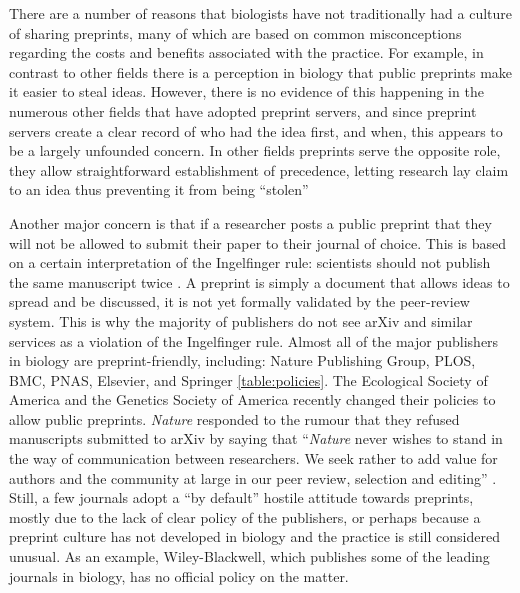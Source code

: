 \documentclass[letterpaper,twocolumn,superscriptaddress,showkeys,longbibliography]{revtex4-1}
\begin{document}
There are a number of reasons that biologists have not traditionally had a
culture of sharing preprints, many of which are based on common misconceptions
regarding the costs and benefits associated with the practice. For example, in contrast
to other fields there is a perception in biology that public preprints
make it easier to steal ideas. However, there is no evidence of this happening
in the numerous other fields that have adopted preprint servers, and since preprint
servers create a clear record of who had the idea first, and when, this
appears to be a largely unfounded concern. In other fields preprints serve the
opposite role, they allow straightforward establishment of precedence, letting
research lay claim to an idea thus preventing it from being ``stolen'' \cite{gin11}

Another major concern is that if a researcher posts a public preprint that they
will not be allowed to submit their paper to their journal of choice.  This is
based on a certain interpretation of the Ingelfinger rule: scientists should not
publish the same manuscript twice \cite{alt96}. A preprint is simply a document
that allows ideas to spread and be discussed, it is not yet formally validated
by the peer-review system. This is why the majority of publishers do not see
arXiv and similar services as a violation of the Ingelfinger rule. Almost all of
the major publishers in biology are preprint-friendly, including: Nature
Publishing Group, PLOS, BMC, PNAS, Elsevier, and Springer \ref{table:policies}.
The Ecological Society of America and the Genetics Society of America recently
changed their policies to allow public preprints. \emph{Nature}
responded to the rumour that they refused manuscripts submitted to arXiv by
saying that ``\emph{Nature} never wishes to stand in the way of communication
between researchers. We seek rather to add value for authors and the community
at large in our peer review, selection and editing'' \cite{nat05}.  Still, a few
journals adopt a ``by default'' hostile attitude towards preprints, mostly due
to the lack of clear policy of the publishers, or perhaps because a preprint
culture has not developed in biology and the practice is still considered
unusual. As an example, Wiley-Blackwell, which publishes some of the leading
journals in biology, has no official policy on the matter.
\end{document}
